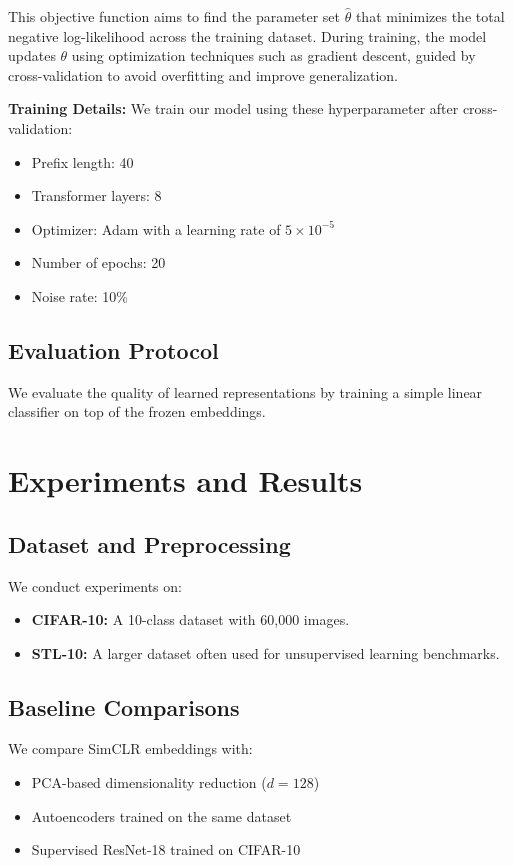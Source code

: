 \documentclass[11pt]{article}
\begin{document}
This objective function aims to find the parameter set $\hat{\theta}$ that minimizes the total negative log-likelihood 
across the training dataset. During training, the model updates $\theta$ using optimization 
techniques such as gradient descent, guided by cross-validation to avoid overfitting and improve generalization.

\textbf{Training Details:} We train our model using these hyperparameter after cross-validation:
\begin{itemize}
  \item Prefix length: 40
  \item Transformer layers: 8
  \item Optimizer: Adam with a learning rate of $5 \times 10^{-5}$
  \item Number of epochs: 20
  \item Noise rate: 10\%
\end{itemize}

\subsection{Evaluation Protocol}
We evaluate the quality of learned representations by training a simple linear classifier on top of the
frozen embeddings.

\section{Experiments and Results}

\subsection{Dataset and Preprocessing}
We conduct experiments on:
\begin{itemize}
  \item \textbf{CIFAR-10:} A 10-class dataset with 60,000 images.
  \item \textbf{STL-10:} A larger dataset often used for unsupervised learning benchmarks.
\end{itemize}

\subsection{Baseline Comparisons}
We compare SimCLR embeddings with:
\begin{itemize}
  \item PCA-based dimensionality reduction ($d = 128$)
  \item Autoencoders trained on the same dataset
  \item Supervised ResNet-18 trained on CIFAR-10
\end{itemize}
\end{document}
